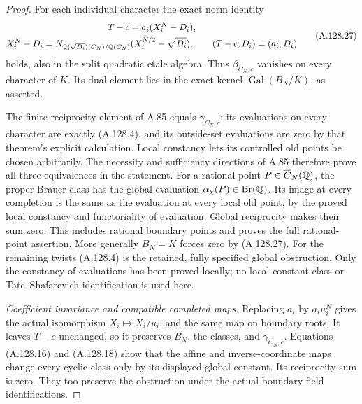 \begin{proof}
For each individual character the exact norm identity
\[
 \begin{gathered}
 T-c=a_i(X_i^N-D_i),\\
 X_i^N-D_i
    =N_{\mathbb Q(\sqrt{D_i})(C_N)/\mathbb Q(C_N)}
                     (X_i^{N/2}-\sqrt{D_i}),\qquad
                (T-c,D_i)=(a_i,D_i)
 \end{gathered}
\tag{A.128.27}
\]
holds, also in the split quadratic etale algebra.
Thus $\beta_{C_N,c}$ vanishes on every character of $K$.
Its dual element lies in the exact kernel
$\operatorname{Gal}(B_N/K)$, as asserted.

The finite reciprocity element of A.85 equals
$\gamma_{C_N,c}$: its evaluations on every character
are exactly (A.128.4), and its outside-set evaluations
are zero by that theorem's explicit calculation.
Local constancy lets its controlled old points be
chosen arbitrarily.
The necessity and sufficiency directions of A.85
therefore prove all three equivalences in the statement.
For a rational point $P\in\overline C_N(\mathbb Q)$, the
proper Brauer class has the global evaluation
$\alpha_\chi(P)\in\operatorname{Br}(\mathbb Q)$.
Its image at every completion is the same as the
evaluation at every local old point, by the proved
local constancy and functoriality of evaluation.
Global reciprocity makes their sum zero.
This includes rational boundary points and proves
the full rational-point assertion.
More generally $B_N=K$ forces zero by (A.128.27).
For the remaining twists (A.128.4) is the retained,
fully specified global obstruction.
Only the constancy of evaluations has been proved
locally; no local constant-class or Tate--Shafarevich
identification is used here.

\emph{Coefficient invariance and compatible completed maps.}
Replacing $a_i$ by $a_i u_i^N$ gives the actual
isomorphism $X_i\mapsto X_i/u_i$, and the same
map on boundary roots.
It leaves $T-c$ unchanged, so it preserves $B_N$,
the classes, and $\gamma_{C_N,c}$.
Equations (A.128.16) and (A.128.18) show that the
affine and inverse-coordinate maps change every
cyclic class only by its displayed global constant.
Its reciprocity sum is zero.
They too preserve the obstruction under the actual
boundary-field identifications.


\end{proof}
